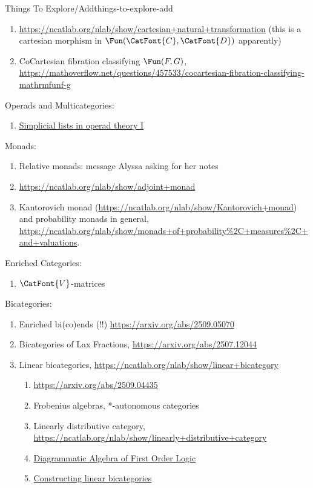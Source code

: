 \begin{remark}{Things To Explore/Add}{things-to-explore-add}
\begin{enumerate}
        \item \url{https://ncatlab.org/nlab/show/cartesian+natural+transformation} (this is a cartesian morphism in $\Fun(\CatFont{C},\CatFont{D})$ apparently)
        \item CoCartesian fibration classifying $\Fun(F,G)$, \url{https://mathoverflow.net/questions/457533/cocartesian-fibration-classifying-mathrmfunf-g}
    \end{enumerate}
    Operads and Multicategories:
    \begin{enumerate}
        \item \href{https://arxiv.org/abs/2405.10072}{Simplicial lists in operad theory I}
    \end{enumerate}
    Monads:
    \begin{enumerate}
        \item Relative monads: message Alyssa asking for her notes
        \item \url{https://ncatlab.org/nlab/show/adjoint+monad}
        \item Kantorovich monad (\url{https://ncatlab.org/nlab/show/Kantorovich+monad}) and probability monads in general, \url{https://ncatlab.org/nlab/show/monads+of+probability\%2C+measures\%2C+and+valuations}.
    \end{enumerate}
    Enriched Categories:
    \begin{enumerate}
        \item $\CatFont{V}$-matrices
    \end{enumerate}
    Bicategories:
    \begin{enumerate}
        \item Enriched bi(co)ends (!!) \url{https://arxiv.org/abs/2509.05070}
        \item Bicategories of Lax Fractions, \url{https://arxiv.org/abs/2507.12044}
        \item Linear bicategories, \url{https://ncatlab.org/nlab/show/linear+bicategory}
            \begin{enumerate}
                \item \url{https://arxiv.org/abs/2509.04435}
                \item Frobenius algebras, *-autonomous categories
                \item Linearly distributive category, \url{https://ncatlab.org/nlab/show/linearly+distributive+category}
                \item \href{https://arxiv.org/abs/2401.07055}{Diagrammatic Algebra of First Order Logic}
                \item \href{https://arxiv.org/abs/2209.05693}{Constructing linear bicategories}

\end{enumerate}
\end{enumerate}
\end{remark}
